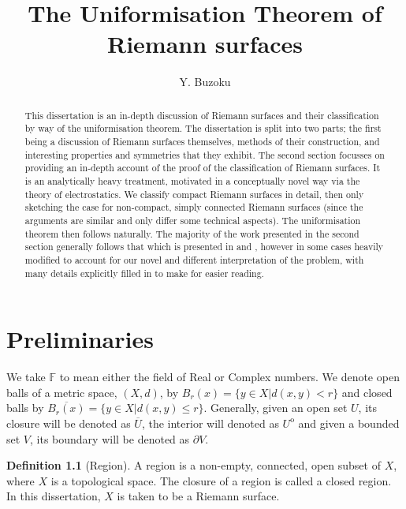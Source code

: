 \documentclass[11pt]{report}
\title{The Uniformisation Theorem of Riemann surfaces}
\author{Y. Buzoku}
\theoremstyle{definition}
\newtheorem{defn}[thm]{Definition}
\begin{document}
\maketitle
\setcounter{tocdepth}{1}  %
\tableofcontents

\newpage
\begin{abstract}
This dissertation is an in-depth discussion of Riemann surfaces and their classification by way of the uniformisation theorem. The dissertation is split into two parts; the first being a discussion of Riemann surfaces themselves, methods of their construction, and interesting properties and symmetries that they exhibit. The second section focusses on providing an in-depth account of the proof of the classification of Riemann surfaces. It is an analytically heavy treatment, motivated in a conceptually novel way via the theory of electrostatics. We classify compact Riemann surfaces in detail, then only sketching the case for non-compact, simply connected Riemann surfaces (since the arguments are similar and only differ some technical aspects). The uniformisation theorem then follows naturally. The majority of the work presented in the second section generally follows that which is presented in \cite{donaldson} and \cite{notes}, however in some cases heavily modified to account for our novel and different interpretation of the problem, with many details explicitly filled in to make for easier reading. 
\end{abstract}
\declaration %


\chapter{Preliminaries}

We take $\mathbb{F}$ to mean either the field of Real or Complex numbers.
We denote open balls of a metric space, $(X,d)$, by $B_r(x) = \{y \in X \vert d(x,y) < r\}$ and closed balls by $\overline{B_r(x)} = \{y \in X \vert d(x,y) \leq r\}$. Generally, given an open set $U$, its closure will be denoted as $\overline{U}$, the interior will denoted as $U^{\mathrm{o}}$ and given a bounded set $V$, its boundary will be denoted as $\partial V$.
\begin{defn}[Region]
  A region is a non-empty, connected, open subset of $X$, where $X$ is a topological space. The closure of a region is called a closed region. In this dissertation, $X$ is taken to be a Riemann surface.
\end{defn}
\end{document}
